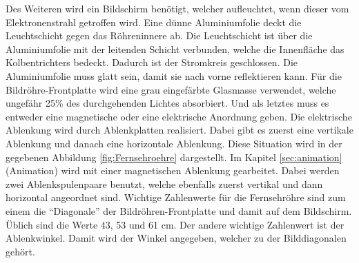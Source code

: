 Des Weiteren wird ein Bildschirm benötigt, welcher aufleuchtet, wenn dieser vom Elektronenstrahl getroffen wird.
Eine dünne Aluminiumfolie deckt die Leuchtschicht gegen das Röhreninnere ab.
Die Leuchtschicht ist über die Aluminiumfolie mit der leitenden Schicht verbunden, welche die Innenfläche das Kolbentrichters bedeckt.
Dadurch ist der Stromkreis geschlossen.
Die Aluminiumfolie muss glatt sein, damit sie nach vorne reflektieren kann.
Für die Bildröhre-Frontplatte wird eine grau eingefärbte Glasmasse verwendet, welche ungefähr 25\% des durchgehenden Lichtes absorbiert.
Und als letztes muss es entweder eine magnetische oder eine elektrische Anordnung geben.
Die elektrische Ablenkung wird durch Ablenkplatten realisiert.
Dabei gibt es zuerst eine vertikale Ablenkung und danach eine horizontale Ablenkung.
Diese Situation wird in der gegebenen Abbildung \ref{fig:Fernsehroehre} dargestellt.
Im Kapitel \ref{sec:animation} (Animation) wird mit einer magnetischen Ablenkung gearbeitet.
Dabei werden zwei Ablenkspulenpaare benutzt, welche ebenfalls zuerst vertikal und dann horizontal angeordnet sind.
Wichtige Zahlenwerte für die Fernsehröhre sind zum einem die "`Diagonale"' der Bildröhren-Frontplatte und damit auf dem Bildschirm.
Üblich sind die Werte 43, 53 und 61 cm.
Der andere wichtige Zahlenwert ist der Ablenkwinkel.
Damit wird der Winkel angegeben, welcher zu der Bilddiagonalen gehört.

